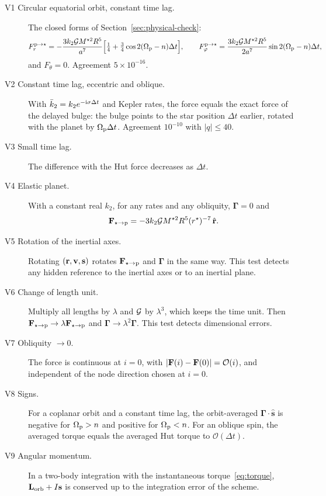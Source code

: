 \begin{description}
  \item[V1 Circular equatorial orbit, constant time lag.] The closed forms of Section~\ref{sec:physical-check}:
  \[
    F^{\mathrm p\to\star}_r=-\frac{3k_2\mathcal{G} M^{\star2}R^5}{a^7}\Big[\tfrac14+\tfrac34\cos2(\Omega_{\mathrm p}-n)\Delta t\Big],\qquad
    F^{\mathrm p\to\star}_\varphi=\frac{3k_2\mathcal{G} M^{\star2}R^5}{2a^7}\sin2(\Omega_{\mathrm p}-n)\Delta t,
  \]
  and $F_\theta=0$.
  Agreement $5\times10^{-16}$.
  \item[V2 Constant time lag, eccentric and oblique.] With $\bar k_2=k_2e^{-\mathrm{i}\sigma\Delta t}$ and Kepler rates, the force equals the exact force of the delayed bulge: the bulge points to the star position $\Delta t$ earlier, rotated with the planet by $\Omega_{\mathrm p}\Delta t$. Agreement $10^{-10}$ with $|q|\le40$.
  \item[V3 Small time lag.] The difference with the Hut force \citep{Hut1981} decreases as $\Delta t$.
  \item[V4 Elastic planet.] With a constant real $k_2$, for any rates and any obliquity, $\boldsymbol\Gamma=0$ and
  \[
    \mathbf F_{\star\to\mathrm p}=-3k_2\mathcal{G} M^{\star2}R^5(r^\star)^{-7}\,\hat{\mathbf r}.
  \]
  \item[V5 Rotation of the inertial axes.] Rotating $(\mathbf r,\mathbf v,\mathbf s)$ rotates $\mathbf F_{\star\to\mathrm p}$ and $\boldsymbol\Gamma$ in the same way. This test detects any hidden reference to the inertial axes or to an inertial plane.
  \item[V6 Change of length unit.] Multiply all lengths by $\lambda$ and $\mathcal{G}$ by $\lambda^3$, which keeps the time unit. Then $\mathbf F_{\star\to\mathrm p}\to\lambda\mathbf F_{\star\to\mathrm p}$ and $\boldsymbol\Gamma\to\lambda^2\boldsymbol\Gamma$. This test detects dimensional errors.
  \item[V7 Obliquity $\to0$.] The force is continuous at $i=0$, with $|\mathbf F(i)-\mathbf F(0)|=\mathcal O(i)$, and independent of the node direction chosen at $i=0$.
  \item[V8 Signs.] For a coplanar orbit and a constant time lag, the orbit-averaged $\boldsymbol\Gamma\cdot\hat{\mathbf s}$ is negative for $\Omega_{\mathrm p}>n$ and positive for $\Omega_{\mathrm p}<n$. For an oblique spin, the averaged torque equals the averaged Hut torque to $\mathcal O(\Delta t)$.
  \item[V9 Angular momentum.] In a two-body integration with the instantaneous torque~\eqref{eq:torque}, $\mathbf L_{\rm orb}+I\mathbf s$ is conserved up to the integration error of the scheme.
\end{description}


